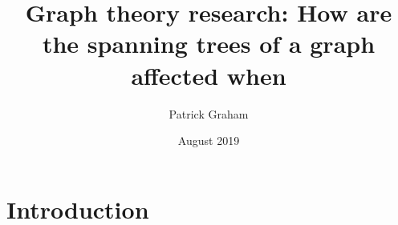 \documentclass{article}
\title{Graph theory research: How are the spanning trees of a graph affected when  }
\author{Patrick Graham}
\date{August 2019}
\begin{document}
\maketitle

\section{Introduction}
\end{document}

